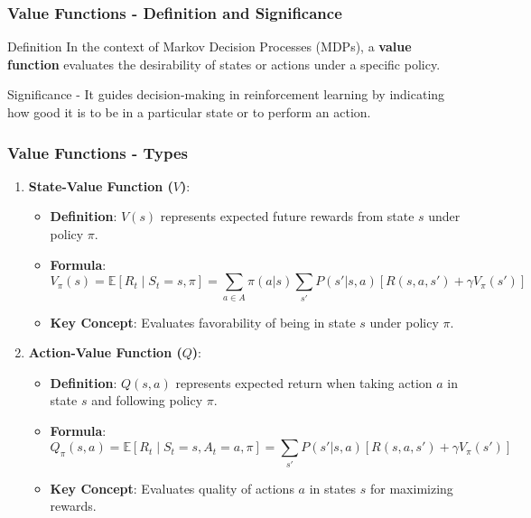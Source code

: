 \documentclass[aspectratio=169]{beamer}
\begin{document}
\begin{frame}[fragile]
    \frametitle{Value Functions - Definition and Significance}
    \begin{block}{Definition}
        In the context of Markov Decision Processes (MDPs), a \textbf{value function} evaluates the desirability of states or actions under a specific policy.
    \end{block}
    \begin{block}{Significance}
        - It guides decision-making in reinforcement learning by indicating how good it is to be in a particular state or to perform an action.
    \end{block}
\end{frame}

\begin{frame}[fragile]
    \frametitle{Value Functions - Types}
    \begin{enumerate}
        \item \textbf{State-Value Function ($V$)}:
        \begin{itemize}
            \item \textbf{Definition}: $V(s)$ represents expected future rewards from state $s$ under policy $\pi$.
            \item \textbf{Formula}:
            \begin{equation}
                V_{\pi}(s) = \mathbb{E} [R_t \mid S_t = s, \pi] = \sum_{a \in A} \pi(a|s) \sum_{s'} P(s'|s,a) \left[R(s,a,s') + \gamma V_{\pi}(s')\right]
            \end{equation}
            \item \textbf{Key Concept}: Evaluates favorability of being in state $s$ under policy $\pi$.
        \end{itemize}
        
        \item \textbf{Action-Value Function ($Q$)}:
        \begin{itemize}
            \item \textbf{Definition}: $Q(s, a)$ represents expected return when taking action $a$ in state $s$ and following policy $\pi$.
            \item \textbf{Formula}:
            \begin{equation}
                Q_{\pi}(s, a) = \mathbb{E} [R_t \mid S_t = s, A_t = a, \pi] = \sum_{s'} P(s'|s,a) \left[R(s,a,s') + \gamma V_{\pi}(s')\right]
            \end{equation}
            \item \textbf{Key Concept}: Evaluates quality of actions $a$ in states $s$ for maximizing rewards.
        \end{itemize}
    \end{enumerate}
\end{frame}
\end{document}
